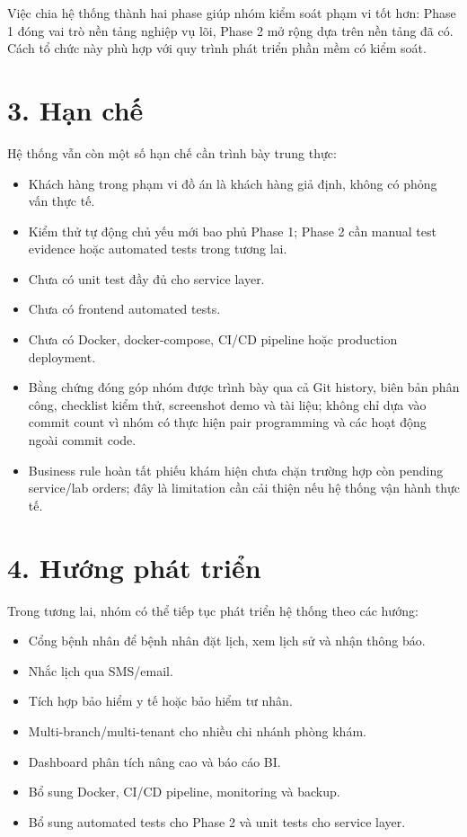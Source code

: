 Việc chia hệ thống thành hai phase giúp nhóm kiểm soát phạm vi tốt hơn: Phase 1 đóng vai trò nền tảng nghiệp vụ lõi, Phase 2 mở rộng dựa trên nền tảng đã có. Cách tổ chức này phù hợp với quy trình phát triển phần mềm có kiểm soát.

\section*{3. Hạn chế}

Hệ thống vẫn còn một số hạn chế cần trình bày trung thực:

\begin{itemize}
    \item Khách hàng trong phạm vi đồ án là khách hàng giả định, không có phỏng vấn thực tế.
    \item Kiểm thử tự động chủ yếu mới bao phủ Phase 1; Phase 2 cần manual test evidence hoặc automated tests trong tương lai.
    \item Chưa có unit test đầy đủ cho service layer.
    \item Chưa có frontend automated tests.
    \item Chưa có Docker, docker-compose, CI/CD pipeline hoặc production deployment.
    \item Bằng chứng đóng góp nhóm được trình bày qua cả Git history, biên bản phân công, checklist kiểm thử, screenshot demo và tài liệu; không chỉ dựa vào commit count vì nhóm có thực hiện pair programming và các hoạt động ngoài commit code.
    \item Business rule hoàn tất phiếu khám hiện chưa chặn trường hợp còn pending service/lab orders; đây là limitation cần cải thiện nếu hệ thống vận hành thực tế.
\end{itemize}

\section*{4. Hướng phát triển}

Trong tương lai, nhóm có thể tiếp tục phát triển hệ thống theo các hướng:

\begin{itemize}
    \item Cổng bệnh nhân để bệnh nhân đặt lịch, xem lịch sử và nhận thông báo.
    \item Nhắc lịch qua SMS/email.
    \item Tích hợp bảo hiểm y tế hoặc bảo hiểm tư nhân.
    \item Multi-branch/multi-tenant cho nhiều chi nhánh phòng khám.
    \item Dashboard phân tích nâng cao và báo cáo BI.
    \item Bổ sung Docker, CI/CD pipeline, monitoring và backup.
    \item Bổ sung automated tests cho Phase 2 và unit tests cho service layer.
\end{itemize}

